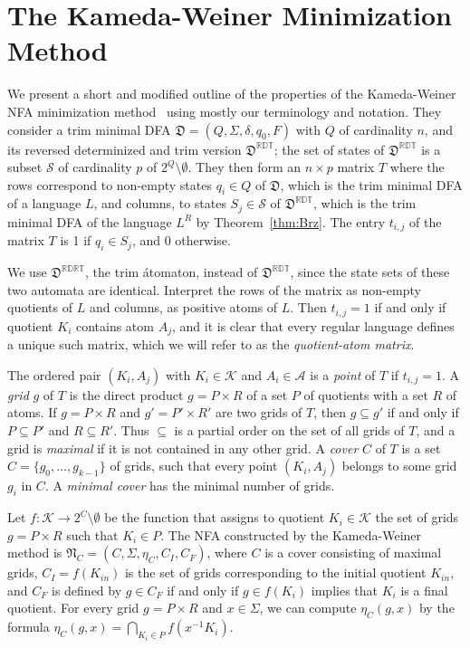 \documentclass{llncs}
\newcommand{\emp}{\emptyset}
\newcommand{\Sig}{\Sigma}
\newcommand{\cA}{{\mathcal A}}
\newcommand{\cK}{{\mathcal K}}
\newcommand{\cS}{{\mathcal S}}
\newcommand{\fD}{{\mathfrak D}}
\newcommand{\fN}{{\mathfrak N}}
\newcommand{\rev}{\mathbb{R}}
\newcommand{\deter}{\mathbb{D}}
\newcommand{\trim}{\mathbb{T}}
\begin{document}
\section{The Kameda-Weiner Minimization Method}
\label{sec:KW}

We present a short and modified outline of the properties of the Kameda-Weiner 
NFA minimization method~\cite{KaWe70} using mostly our terminology and notation. 
They consider a trim minimal DFA $\fD=(Q,\Sig,\delta,q_0,F)$ with $Q$ of 
cardinality $n$, and its reversed  determinized and trim version $\fD^{\rev\deter\trim}$; 
the set of states of $\fD^{\rev\deter\trim}$ is a subset $\cS$ of cardinality $p$ of 
$2^Q\setminus\emp$. 
They then 
form an $n\times p$ matrix $T$ where the rows correspond to non-empty states $q_i\in Q$ of $\fD$, 
which is the trim minimal DFA of a language $L$, 
and columns, to states $S_j\in \cS$ of $\fD^{\rev\deter\trim}$, 
which is the trim minimal DFA of the language $L^R$ by Theorem~\ref{thm:Brz}.
The entry $t_{i,j}$ of the matrix $T$ is 1 if $q_i\in S_j$, and 0 otherwise.

We use $\fD^{\rev\deter\rev\trim}$, the trim \'atomaton,  instead of $\fD^{\rev\deter\trim}$, 
since the state sets of these two automata are identical.  
Interpret the rows of the matrix as non-empty quotients of $L$ and columns, 
as positive atoms of $L$. Then $t_{i,j}=1$ if and only if quotient $K_i$ contains 
atom $A_j$, and it is clear that every regular language defines a 
unique such matrix, which we will refer to as the \emph{quotient-atom matrix}.

The ordered pair $(K_i,A_j)$ with $K_i\in \cK$ and $A_i\in \cA$ is a \emph{point} 
of $T$ if $t_{i,j}=1$.
A \emph{grid} $g$ of $T$ is the direct product $g=P\times R$ of a set $P$ of quotients with a set $R$ of atoms.
If $g=P\times R$ and $g'=P'\times R'$ are two grids  of $T$, 
then $g\subseteq g'$ if and only if $P\subseteq P'$ and $R\subseteq R'$.
Thus $\subseteq$ is a partial order on the set of all grids of $T$, 
and a grid is \emph{maximal} if it is not contained in any other grid.
A \emph{cover} $C$ of $T$ is a set $C=\{g_0,\ldots,g_{k-1}\}$ of grids,  
such that every point $(K_i,A_j)$ belongs to some grid $g_i$ in $C$.
A \emph{minimal cover}  has the minimal number
of grids.

Let $f:\cK\to 2^C\setminus \emp$ be the function that assigns to quotient 
$K_i\in \cK$ the set of grids $g=P\times R$ such that $K_i\in P$.
The NFA constructed by the Kameda-Weiner method is $\fN_C=(C,\Sig,\eta_C,C_I,C_F)$, 
where $C$ is a cover consisting of maximal grids, 
$C_I=f(K_{in})$ is the set of grids corresponding to the initial quotient
$K_{in}$, and $C_F$ is defined by $g\in C_F$ if and only if $g\in f(K_i)$ 
implies that $K_i$ is a final quotient.
For every grid $g=P\times R$ and $x\in\Sig$, we can compute 
$\eta_C(g,x)$ by the formula $\eta_C(g,x)=\bigcap_{K_i\in P} f(x^{-1}K_i)$.
\end{document}
